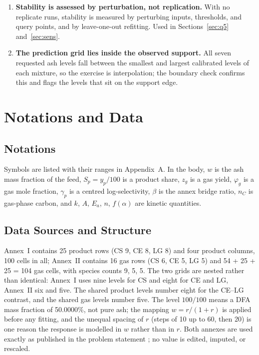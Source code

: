 \documentclass[withoutpreface,bwprint]{apmcmthesis}
\begin{document}
\begin{enumerate}
\item \textbf{Stability is assessed by perturbation, not replication.} With no replicate runs, stability is measured by perturbing inputs, thresholds, and query points, and by leave-one-out refitting. Used in Sections~\ref{sec:q5} and~\ref{sec:sens}.
\item \textbf{The prediction grid lies inside the observed support.} All seven requested ash levels fall between the smallest and largest calibrated levels of each mixture, so the exercise is interpolation; the boundary check confirms this and flags the levels that sit on the support edge.
\end{enumerate}

\section{Notations and Data}
\subsection{Notations}
Symbols are listed with their ranges in Appendix~A. In the body, $w$ is the ash mass fraction of the feed, $S_p=y_p/100$ is a product share, $z_g$ is a gas yield, $\varphi_g$ is a gas mole fraction, $\gamma_p$ is a centred log-selectivity, $\beta$ is the annex bridge ratio, $n_C$ is gas-phase carbon, and $k$, $A$, $E_a$, $n$, $f(\alpha)$ are kinetic quantities.

\subsection{Data Sources and Structure}
Annex~I contains 25 product rows (CS 9, CE 8, LG 8) and four product columns, 100 cells in all; Annex~II contains 16 gas rows (CS 6, CE 5, LG 5) and 54 + 25 + 25 = 104 gas cells, with species counts 9, 5, 5. The two grids are nested rather than identical: Annex~I uses nine levels for CS and eight for CE and LG, Annex~II six and five. The shared product levels number eight for the CE--LG contrast, and the shared gas levels number five. The level $100/100$ means a DFA mass fraction of 50.0000\%, not pure ash; the mapping $w=r/(1+r)$ is applied before any fitting, and the unequal spacing of $r$ (steps of 10 up to 60, then 20) is one reason the response is modelled in $w$ rather than in $r$. Both annexes are used exactly as published in the problem statement \cite{ProblemB2023}; no value is edited, imputed, or rescaled.
\end{document}
